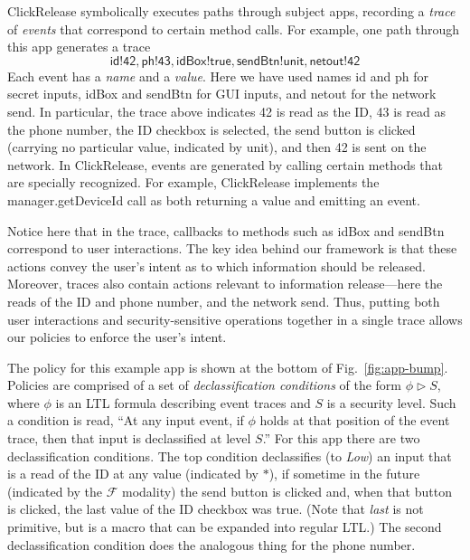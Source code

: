 \documentclass{llncs}
\newcommand{\code}[1]{\textsf{#1}} %
\newcommand{\toolname}{ClickRelease\xspace}
\newcommand{\tfuture}{\mathcal{F}}
\begin{document}
\toolname{} symbolically executes paths through subject apps, recording a
\emph{trace} of \emph{events} that correspond to certain method calls.
For example, one path through this app generates a trace
\begin{displaymath}
   \code{id!42}, \code{ph!43}, \code{idBox!true},
    \code{sendBtn!unit}, \code{netout!}\code{42}
\end{displaymath}
Each event has a \emph{name} and a \emph{value}. Here we have used
names \code{id} and \code{ph} for secret inputs, \code{idBox} and
\code{sendBtn} for GUI inputs, and \code{netout} for the network
send.  In particular, the trace above indicates 42 is read as the ID,
43 is read as the phone number, the ID checkbox is selected, the send
button is clicked (carrying no particular value, indicated by
\code{unit}), and then 42 is sent on the network. In \toolname{},
events are generated by calling certain methods that are specially
recognized. For example, \toolname{} implements the
\code{manager.getDeviceId} call as both returning a value and emitting
an event.

Notice here that in the trace, callbacks to methods such as
\code{idBox} and \code{sendBtn} correspond to user
interactions. The key idea behind our framework is that these actions
convey the user's intent as to which information should be
released. Moreover, traces also contain actions relevant to
information release---here the reads of the ID and phone number, and
the network send. Thus, putting both user interactions and
security-sensitive operations together in a single trace allows
our policies to enforce the user's intent.

The policy for
this example app is shown at the bottom of Fig.~\ref{fig:app-bump}.
Policies are comprised of a set of \emph{declassification
  conditions} of the form $\phi \rhd S$, where $\phi$ is an LTL
formula describing event traces and $S$ is a security level.  Such a
condition is read, ``At any input event, if $\phi$ holds at that
position of the event trace, then that input is declassified at level
$S$.''  For this app there are two declassification conditions. The
top condition declassifies (to \emph{Low}) an input that is a
read of the ID at any value (indicated by $\ast$), if
sometime in the future (indicated by the $\tfuture$ modality) the send
button is clicked and, when that button is clicked, the last value of
the ID checkbox was \code{true}. (Note that \emph{last} is not
primitive, but is a macro that can be expanded into regular LTL.)  The
second declassification condition does the analogous thing for the
phone number.
\end{document}
